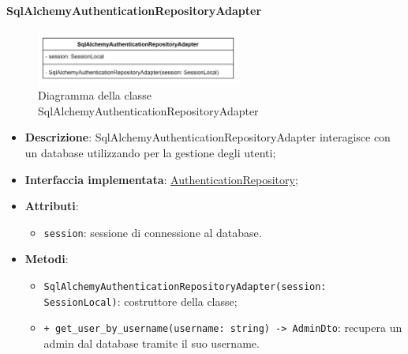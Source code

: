 \paragraph{SqlAlchemyAuthenticationRepositoryAdapter} \label{SqlAlchemyAuthenticationRepositoryAdapter}
\begin{figure}[H]
    \centering
    \includegraphics[width=0.6\textwidth]{assets/Backend/sql_alchemy_authentication_repository_adapter.png}
    \caption{Diagramma della classe SqlAlchemyAuthenticationRepositoryAdapter}
  \end{figure}
\begin{itemize}
    \item \textbf{Descrizione}: SqlAlchemyAuthenticationRepositoryAdapter interagisce con un database utilizzando  per la gestione degli utenti;
    \item \textbf{Interfaccia implementata}: \hyperref[AuthenticationRepository]{AuthenticationRepository};
    \item \textbf{Attributi}:
    \begin{itemize}
        \item \texttt{session}: sessione di connessione al database.
    \end{itemize}
    \item \textbf{Metodi}:
    \begin{itemize}
        \item \texttt{SqlAlchemyAuthenticationRepositoryAdapter(session: SessionLocal)}: costruttore della classe;
        \item \texttt{+ get\_user\_by\_username(username: string) -> AdminDto}: recupera un admin dal database tramite il suo username.
    \end{itemize}
\end{itemize} 

